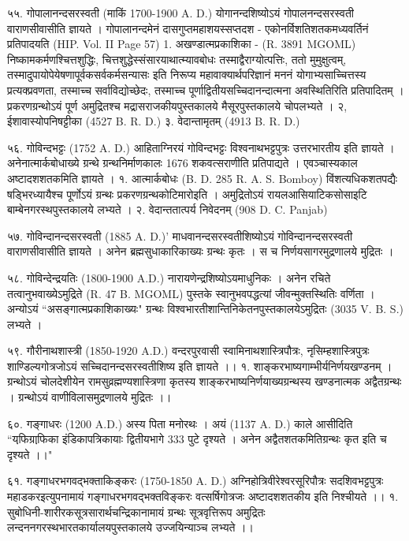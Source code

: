 ५५. गोपालानन्दसरस्वती (माकिं 1700-1900 A. D.)
योगानन्दशिष्योऽयं गोपालनन्दसरस्वती वाराणसीवासीति ज्ञायते । गोपालानन्दमेनं दासगुप्तमहाशयस्सप्तदश - एकोनर्विशतिशतकमध्यवर्तिनं प्रतिपादयति (HIP. Vol. II Page 57)
1. अखण्डात्मप्रकाशिका - (R. 3891 MGOML)
निष्कामकर्मणश्चित्तशुद्धिः, चित्तशुद्धेस्संसारयाथात्म्यावबोधः तस्माद्वैराग्योत्पत्तिः, ततो मुमुक्षुत्वम्, तस्मादुपायोपेयेषणापूर्वकसर्वकर्मसन्यासः इति निरूप्य महावाक्यार्थपरिज्ञानं मननं योगाभ्यसाच्चित्तस्य प्रत्यक्प्रवणता, तस्माच्च सर्वाविद्योच्छेदः, तस्माच्च पूर्णाद्वितीयसच्चिदानन्दात्मना अवस्थितिरिति प्रतिपादितम् । प्रकरणग्रन्थोऽयं पूर्ण अमुद्रितश्च मद्रासराजकीयपुस्तकालये मैसूरपुस्तकालये चोपलभ्यते ।
२, ईशावास्योपनिषट्टीका (4527 B. R. D.)
३. वेदान्तामृतम् (4913 B. R. D.)

५६. गोविन्दभट्टः (1752 A. D.)
आहिताग्निरयं गोविन्दभट्टः विश्वनाथभट्टपुत्रः उत्तरभारतीय इति ज्ञायते । अनेनात्मार्कबोधाख्ये ग्रन्थे ग्रन्थनिर्माणकालः 1676 शकवत्सराणीति प्रतिपाद्यते । एवञ्चास्यकाल अष्टादशशतकमिति ज्ञायते ।
१. आत्मार्कबोधः (B. D. 285 R. A. S. Bomboy)
विंशत्यधिकशतपद्यैः षड्भिरध्यायैश्च पूर्णोऽयं ग्रन्थः प्रकरणग्रन्थकोटिमारोइति । अमुद्रितोऽयं रायलआसियाटिकसोसाइटि बाम्बेनगरस्थपुस्तकालये लभ्यते ।
२. वेदान्ततात्पर्य निवेदनम् (908 D. C. Panjab)

५७. गोविन्दानन्दसरस्वती (1885 A. D.)'
माधवानन्दसरस्वतीशिष्योऽयं गोविन्दानन्दसरस्वती वाराणसीवासीति ज्ञायते । अनेन ब्रह्मसुधाकारिकाख्यः ग्रन्थः कृतः । स च निर्णयसागरमुद्रणालये मुद्रितः ।

५८. गोविन्देन्द्रयतिः (1800-1900 A.D.)
नारायणेन्द्रशिष्योऽयमाधुनिकः । अनेन रचिते तत्वानुभवाख्येऽमुद्रिते (R. 47 B. MGOML) पुस्तके स्वानुभवपद्धत्यां जीवन्मुक्तस्थितिः वर्णिता । अन्योऽयं ``असङ्गात्मप्रकाशिकाख्यः" ग्रन्थः विश्वभारतीशान्तिनिकेतनपुस्तकालयेऽमुद्रितः (3035 V. B. S.) लभ्यते ।

५९. गौरीनाथशास्त्री (1850-1920 A.D.)
वन्दरपुरवासी स्वामिनाथशास्त्रिपौत्रः, नृसिम्हशास्त्रिपुत्रः शाण्डिल्यगोत्रजोऽयं सच्चिदानन्दसरस्वतीशिष्य इति ज्ञायते ।।
१. शाङ्करभाष्यगाम्भीर्यनिर्णयखण्डनम् । ग्रन्थोऽयं चोलदेशीयेन रामसुव्रह्मण्यशास्त्रिणा कृतस्य शाङ्करभाष्यनिर्णयाख्यग्रन्थस्य खण्डनात्मक अद्वैतग्रन्थः । ग्रन्थोऽयं वाणीविलासमुद्रणालये मुद्रितः ।।

६०. गङ्गाधरः (1200 A.D.)
अस्य पिता मनोरथः । अयं (1137 A. D.) काले आसीदिति ``यफि़ग्राफि़का इंडिकापत्रिकायाः द्वितीयभागे 333 पुटे दृश्यते । अनेन अद्वैतशतकमितिग्रन्थः कृत इति च दृश्यते ।।"

६१. गङ्गाधरभगवद्भक्ताकिङ्करः (1750-1850 A. D.)
अग्निहोत्रिवीरेश्वरसूरिपौत्रः सदशिवभट्टपुत्रः महाडकरइत्युपनामायं गङ्गाधरभगवद्भक्तविङ्करः वत्सर्षिगोत्रजः अष्टादशशतकीय इति निश्चीयते ।।
१. सुबोधिनी-शारीरकसूत्रसारार्थचन्द्रिकानामायं ग्रन्थः सूत्रवृत्तिरूप अमुद्रितः लन्दननगरस्थभारतकार्यालयपुस्तकालये उज्जयिन्याञ्च लभ्यते ।।


